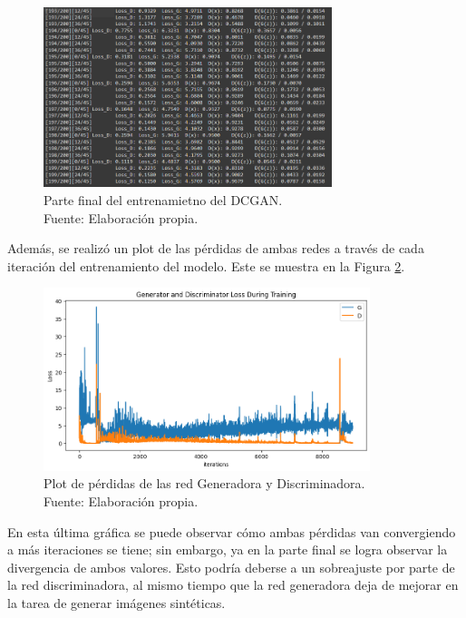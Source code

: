 \begin{figure}[H]
	\begin{center}
		\includegraphics[width=0.75\textwidth]{4/figures/dcgan_1_train.PNG}
		\caption[Parte final del entrenamietno del DCGAN]{Parte final del entrenamietno del DCGAN. \\
		Fuente: Elaboración propia.}
		\label{4:fig113}
	\end{center}
\end{figure}

Además, se realizó un plot de las pérdidas de ambas redes a través de cada iteración del entrenamiento del modelo. Este se muestra en la Figura \ref{4:fig114}.

\begin{figure}[H]
	\begin{center}
		\includegraphics[width=0.85\textwidth]{4/figures/plot_loss_1.png}
		\caption[Plot de pérdidas de las red Generadora y Discriminadora]{Plot de pérdidas de las red Generadora y Discriminadora. \\
		Fuente: Elaboración propia.}
		\label{4:fig114}
	\end{center}
\end{figure}

En esta última gráfica se puede observar cómo ambas pérdidas van convergiendo a más iteraciones se tiene; sin embargo, ya en la parte final se logra observar la divergencia de ambos valores. Esto podría deberse a un sobreajuste por parte de la red discriminadora, al mismo tiempo que la red generadora deja de mejorar en la tarea de generar imágenes sintéticas.

